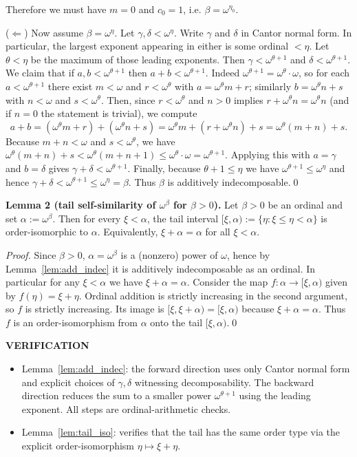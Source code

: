 Therefore we must have $m=0$ and $c_0=1$, i.e. $\beta=\omega^{\eta_0}$.

($\Leftarrow$)
Now assume $\beta=\omega^\eta$.
Let $\gamma,\delta<\omega^\eta$.
Write $\gamma$ and $\delta$ in Cantor normal form. In particular, the largest exponent appearing in either is some ordinal $<\eta$.
Let $\theta<\eta$ be the maximum of those leading exponents.
Then $\gamma<\omega^{\theta+1}$ and $\delta<\omega^{\theta+1}$.
We claim that if $a,b<\omega^{\theta+1}$ then $a+b<\omega^{\theta+1}$.
Indeed $\omega^{\theta+1}=\omega^{\theta}\cdot\omega$, so for each $a<\omega^{\theta+1}$ there exist $m<\omega$ and $r<\omega^{\theta}$ with $a=\omega^{\theta}m+r$; similarly $b=\omega^{\theta}n+s$ with $n<\omega$ and $s<\omega^{\theta}$.
Then, since $r<\omega^{\theta}$ and $n>0$ implies $r+\omega^{\theta}n=\omega^{\theta}n$ (and if $n=0$ the statement is trivial), we compute
\[
a+b=(\omega^{\theta}m+r)+(\omega^{\theta}n+s)=\omega^{\theta}m+(r+\omega^{\theta}n)+s=\omega^{\theta}(m+n)+s.
\]
Because $m+n<\omega$ and $s<\omega^{\theta}$, we have $\omega^{\theta}(m+n)+s<\omega^{\theta}(m+n+1)\le\omega^{\theta}\cdot\omega=\omega^{\theta+1}$.
Applying this with $a=\gamma$ and $b=\delta$ gives $\gamma+\delta<\omega^{\theta+1}$.
Finally, because $\theta+1\le\eta$ we have $\omega^{\theta+1}\le\omega^\eta$ and hence
$\gamma+\delta<\omega^{\theta+1}\le\omega^\eta=\beta$.
Thus $\beta$ is additively indecomposable.\qed

\medskip
\noindent\textbf{Lemma 2 (tail self-similarity of $\omega^\beta$ for $\beta>0$).}\label{lem:tail_iso}
Let $\beta>0$ be an ordinal and set $\alpha:=\omega^\beta$.
Then for every $\xi<\alpha$, the tail interval $[\xi,\alpha):=\{\eta:\xi\le \eta<\alpha\}$ is order-isomorphic to $\alpha$.
Equivalently, $\xi+\alpha=\alpha$ for all $\xi<\alpha$.

\emph{Proof.}
Since $\beta>0$, $\alpha=\omega^\beta$ is a (nonzero) power of $\omega$, hence by Lemma~\ref{lem:add_indec} it is additively indecomposable as an ordinal.
In particular for any $\xi<\alpha$ we have $\xi+\alpha=\alpha$.
Consider the map $f:\alpha\to [\xi,\alpha)$ given by $f(\eta)=\xi+\eta$.
Ordinal addition is strictly increasing in the second argument, so $f$ is strictly increasing.
Its image is $[\xi,\xi+\alpha)=[\xi,\alpha)$ because $\xi+\alpha=\alpha$.
Thus $f$ is an order-isomorphism from $\alpha$ onto the tail $[\xi,\alpha)$.\qed

\bigskip
\noindent\textbf{VERIFICATION}

\begin{itemize}
\item Lemma~\ref{lem:add_indec}: the forward direction uses only Cantor normal form and explicit choices of $\gamma,\delta$ witnessing decomposability. The backward direction reduces the sum to a smaller power $\omega^{\theta+1}$ using the leading exponent. All steps are ordinal-arithmetic checks.
\item Lemma~\ref{lem:tail_iso}: verifies that the tail has the same order type via the explicit order-isomorphism $\eta\mapsto \xi+\eta$.
\end{itemize}

